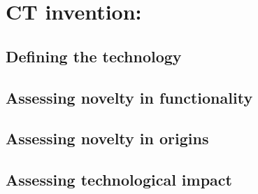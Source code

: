 \section{CT invention: }
\subsection{Defining the technology}

\subsection{Assessing novelty in functionality}

\subsection{Assessing novelty in origins}

\subsection{Assessing technological impact}